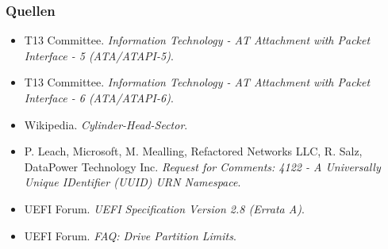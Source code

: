 \begin{frame}
    \frametitle{Quellen}

    \begin{itemize}
        \item T13 Committee.
        \textit{Information Technology - AT Attachment with Packet Interface - 5 (ATA/ATAPI-5)}.

        \item T13 Committee.
        \textit{Information Technology - AT Attachment with Packet Interface - 6 (ATA/ATAPI-6)}.

        \item  Wikipedia.
        \textit{Cylinder-Head-Sector}.

        \item P. Leach, Microsoft, M. Mealling, Refactored Networks LLC, R. Salz, DataPower Technology Inc.
        \textit{Request for Comments: 4122 - A Universally Unique IDentifier (UUID) URN Namespace}.
        
        \item UEFI Forum.
        \textit{UEFI Specification Version 2.8 (Errata A)}.

        \item  UEFI Forum.
        \textit{FAQ: Drive Partition Limits}.
    \end{itemize}
\end{frame}
